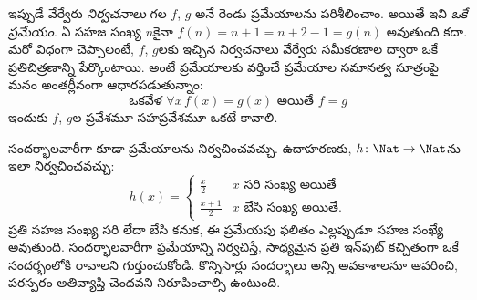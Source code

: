 \documentclass[../../../include/open-logic-section]{subfiles}
\begin{document}
\begin{explain}
ఇప్పుడే వేర్వేరు \emph{నిర్వచనాలు} గల $f$, $g$ అనే రెండు ప్రమేయాలను
పరిశీలించాం. అయితే ఇవి \emph{ఒకే ప్రమేయం}. ఏ సహజ సంఖ్య $n$కైనా
$f(n) = n+1 = n+2-1 = g(n)$ అవుతుంది కదా.
మరో విధంగా చెప్పాలంటే, $f$, $g$లకు ఇచ్చిన నిర్వచనాలు వేర్వేరు
సమీకరణాల ద్వారా ఒకే ప్రతిచిత్రణాన్ని పేర్కొంటాయి. అంటే ప్రమేయాలకు
వర్తించే ప్రమేయాల సమానత్వ సూత్రంపై మనం అంతర్లీనంగా ఆధారపడుతున్నాం:
\[
  \text{ఒకవేళ }\forall x\, f(x) = g(x)\text{ అయితే }f = g
\]
ఇందుకు $f$, $g$ల ప్రవేశమూ సహప్రవేశమూ ఒకటే కావాలి.
\end{explain}

\begin{ex}
సందర్భాలవారీగా కూడా ప్రమేయాలను నిర్వచించవచ్చు.
ఉదాహరణకు, $h \colon \Nat \to \Nat$ను ఇలా నిర్వచించవచ్చు:
\[
h(x) =
\begin{cases}
  \frac{x}{2} & \text{$x$ సరి సంఖ్య అయితే} \\
  \frac{x+1}{2} & \text{$x$ బేసి సంఖ్య అయితే.}
\end{cases}
\]
ప్రతి సహజ సంఖ్య సరి లేదా బేసి కనుక, ఈ ప్రమేయపు ఫలితం ఎల్లప్పుడూ
సహజ సంఖ్యే అవుతుంది. సందర్భాలవారీగా ప్రమేయాన్ని నిర్వచిస్తే,
సాధ్యమైన ప్రతి ఇన్‌పుట్ కచ్చితంగా ఒకే సందర్భంలోకి రావాలని గుర్తుంచుకోండి.
కొన్నిసార్లు సందర్భాలు అన్ని అవకాశాలనూ ఆవరించి, పరస్పరం అతివ్యాప్తి
చెందవని నిరూపించాల్సి ఉంటుంది.
\end{ex}
\end{document}
